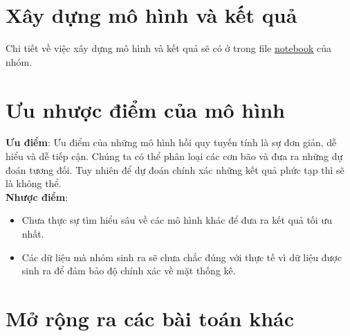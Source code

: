 \documentclass[12pt]{report}
\begin{document}
\section{Xây dựng mô hình và kết quả} %
\label{sec:xây_dựng_mô_hình_và_kết_quả}
\begin{flushleft}
	Chi tiết về việc xây dựng mô hình và kết quả sẽ có ở trong file \textcolor{blue}{\underline{\href{https://github.com/XuananLe/MathModelingContest/blob/main/main.ipynb}{notebook}}} của nhóm.
\end{flushleft}

\section{Ưu nhược điểm của mô hình} %
\label{sec:ưu_nhược_điểm_của_mô_hình}
\begin{flushleft}
	\textbf{Ưu điểm}: Ưu điểm của những mô hình hồi quy tuyến tính là sự đơn giản, dễ hiểu và dễ tiếp cận. Chúng ta có thể phân loại các cơn bão và đưa ra những dự đoán tương đối. Tuy nhiên để dự đoán chính xác những kết quả phức tạp thì sẽ là không thể.
	\\[\baselineskip]

	\textbf{Nhược điểm}:
	\begin{itemize}
		\item Chưa thực sự tìm hiểu sâu về các mô hình khác để đưa ra kết quả tối ưu nhất.

		\item Các dữ liệu mà nhóm sinh ra sẽ chưa chắc đúng với thực tế vì dữ liệu được sinh ra để đảm bảo độ chính xác về mặt thống kê.
	\end{itemize}
\end{flushleft}

\section{Mở rộng ra các bài toán khác} %
\label{sub:mở_rộng_ra_các_bài_toán_khác}
\end{document}
